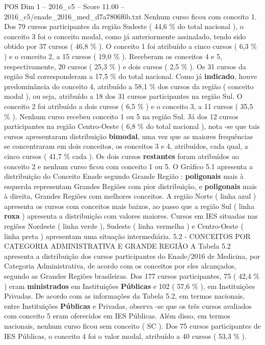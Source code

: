 \begin{textsample}{POS Dim 1 – 2016\_c5 – Score 11.00 – 2016\_c5/enade\_2016\_med\_d7a7806f6b.txt}
Nenhum curso ficou com conceito 1.
Dos 79 cursos participantes da região Sudeste ( 44,6 \% do total nacional ), o conceito 3 foi o conceito modal, como já anteriormente assinalado, tendo sido obtido por 37 cursos ( 46,8 \% ).
O conceito 1 foi atribuído a cinco cursos ( 6,3 \% ) e o conceito 2, a 15 cursos ( 19,0 \% ).
Receberam os conceitos 4 e 5, respectivamente, 20 cursos ( 25,3 \% ) e dois cursos ( 2,5 \% ).
Os 31 cursos da região Sul corresponderam a 17,5 \% do total nacional.
Como já \textbf{indicado}, houve predominância do conceito 4, atribuído a 58,1 \% dos cursos da região ( conceito modal ), ou seja, atribuído a 18 dos 31 cursos participantes na região Sul.
O conceito 2 foi atribuído a dois cursos ( 6,5 \% ) e o conceito 3, a 11 cursos ( 35,5 \% ).
Nenhum curso recebeu conceito 1 ou 5 na região Sul.
Já dos 12 cursos participantes na região Centro-Oeste ( 6,8 \% do total nacional ), nota -se que tais cursos apresentaram distribuição \textbf{bimodal}, uma vez que as maiores frequências se concentraram em dois conceitos, os conceitos 3 e 4, atribuídos, cada qual, a cinco cursos ( 41,7 \% cada ).
Os dois cursos \textbf{restantes} foram atribuídos ao conceito 2 e nenhum curso ficou com conceito 1 ou 5.
O Gráfico 5.1 apresenta a distribuição do Conceito Enade segundo Grande Região : \textbf{poligonais} mais à esquerda representam Grandes Regiões com pior distribuição, e \textbf{poligonais} mais à direita, Grandes Regiões com melhores conceitos.
A região Norte ( linha azul ) apresenta os cursos com conceitos mais baixos, ao passo que a região Sul ( linha \textbf{roxa} ) apresenta a distribuição com valores maiores.
Cursos em IES situadas nas regiões Nordeste ( linha verde ), Sudeste ( linha vermelha ) e Centro-Oeste ( linha preta ) apresentam uma situação intermediária. 5.2 - CONCEITOS POR CATEGORIA ADMINISTRATIVA E GRANDE REGIÃO A Tabela 5.2 apresenta a distribuição dos cursos participantes do Enade/2016 de Medicina, por Categoria Administrativa, de acordo com os conceitos por eles alcançados, segundo as Grandes Regiões brasileiras.
Dos 177 cursos participantes, 75 ( 42,4 \% ) eram \textbf{ministrados} em Instituições \textbf{Públicas} e 102 ( 57,6 \% ), em Instituições Privadas.
De acordo com as informações da Tabela 5.2, em termos nacionais, entre Instituições \textbf{Públicas} e Privadas, observa -se que os três cursos avaliados com conceito 5 eram oferecidos em IES Públicas.
Além disso, em termos nacionais, nenhum curso ficou sem conceito ( SC ).
Dos 75 cursos participantes de IES Públicas, o conceito 4 foi o valor modal, atribuído a 40 cursos ( 53,3 \% ).

\end{textsample}
